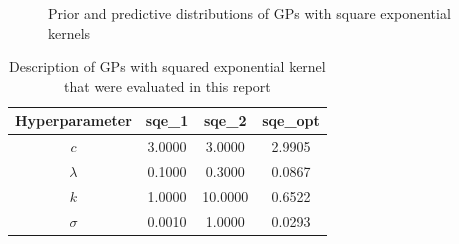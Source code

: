 \documentclass{article}
\begin{document}
\begin{figure}[pht]
{        }
    \newline
    \caption{Prior and predictive distributions of GPs with square exponential kernels}
    \label{fig:sqe}
\end{figure}


\begin{table}[ht]
    \centering
    \begin{tabular}{|c|c|c|c|}
        \hline
        Hyperparameter & sqe\_1 & sqe\_2 & sqe\_opt \\
        \hline
        $c$ & 3.0000 & 3.0000 & 2.9905 \\
        $\lambda$ & 0.1000 & 0.3000 & 0.0867 \\
        $k$ & 1.0000 & 10.0000 & 0.6522 \\
        $\sigma$ & 0.0010 & 1.0000 & 0.0293 \\
        \hline
    \end{tabular}
    \caption{Description of GPs with squared exponential kernel that were evaluated in this report}
    \label{table:sqe_details_table}
\end{table}

\end{document}
